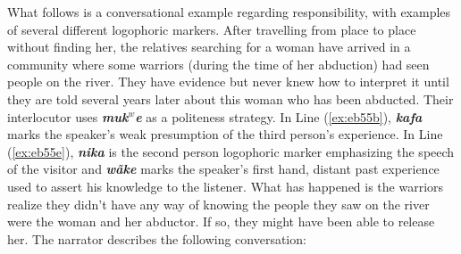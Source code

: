 \documentclass[output=paper]{langsci/langscibook}
\begin{document}
What follows is a conversational example regarding responsibility,  with examples of several different logophoric markers.  After travelling from place to place without finding her, the relatives searching for a woman have arrived in a community where some warriors (during the time of her abduction) had seen people on the river.  They have evidence but never knew how to interpret it until they are told several years later about this woman who has been abducted.  Their interlocutor uses \textbf{\textit{muk$^w$e}} as a politeness strategy.  In Line (\ref{ex:eb55b}), \textbf{\textit{kafa}} marks the speaker’s weak presumption of the third person’s experience.  In Line (\ref{ex:eb55e}), \textbf{\textit{nika}} is the second person logophoric marker emphasizing the speech of the visitor and \textbf{\textit{wãke}}  marks the speaker’s first hand, distant past experience used to assert his knowledge to the listener. What has happened is the warriors realize they didn’t have any way of knowing the people they saw on the river were the woman and her abductor.  If so,  they might have been able to release her. The narrator describes the following conversation: 
\end{document}
